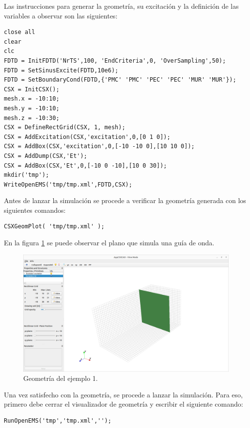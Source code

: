 \documentclass[
    11pt,
    spanish,
	a4paper
]{article}
\begin{document}
Las instrucciones para generar la geometría, su excitación y la definición de
las variables a observar son las siguientes:

\begin{verbatim}
close all
clear
clc
FDTD = InitFDTD('NrTS',100, 'EndCriteria',0, 'OverSampling',50);
FDTD = SetSinusExcite(FDTD,10e6);
FDTD = SetBoundaryCond(FDTD,{'PMC' 'PMC' 'PEC' 'PEC' 'MUR' 'MUR'});
CSX = InitCSX();
mesh.x = -10:10;
mesh.y = -10:10;
mesh.z = -10:30;
CSX = DefineRectGrid(CSX, 1, mesh);
CSX = AddExcitation(CSX,'excitation',0,[0 1 0]);
CSX = AddBox(CSX,'excitation',0,[-10 -10 0],[10 10 0]);
CSX = AddDump(CSX,'Et');
CSX = AddBox(CSX,'Et',0,[-10 0 -10],[10 0 30]);
mkdir('tmp');
WriteOpenEMS('tmp/tmp.xml',FDTD,CSX);
\end{verbatim}

Antes de lanzar la simulación se procede a verificar la geometría generada con
los siguientes comandos:

\begin{verbatim}
CSXGeomPlot( 'tmp/tmp.xml' );
\end{verbatim}

En la figura \ref{fig:geo1} se puede observar el plano que simula una guía de onda.

\begin{figure}[htbp]
	\centering
	\includegraphics[width=\textwidth]{./img/geo1.png}
	\caption{Geometría del ejemplo 1.}
	\label{fig:geo1}
\end{figure}

Una vez satisfecho con la geometría, se procede a lanzar la simulación. Para
eso, primero debe cerrar el visualizador de geometría y escribir el siguiente
comando:

\begin{verbatim}
RunOpenEMS('tmp','tmp.xml','');
\end{verbatim}
\end{document}
